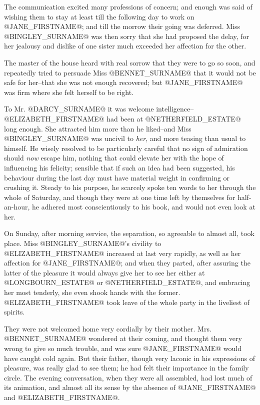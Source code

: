 The communication excited many professions of concern; and enough was
said of wishing them to stay at least till the following day to work
on @JANE_FIRSTNAME@; and till the morrow their going was deferred. Miss @BINGLEY_SURNAME@ was
then sorry that she had proposed the delay, for her jealousy and dislike
of one sister much exceeded her affection for the other.

The master of the house heard with real sorrow that they were to go so
soon, and repeatedly tried to persuade Miss @BENNET_SURNAME@ that it would not be
safe for her--that she was not enough recovered; but @JANE_FIRSTNAME@ was firm where
she felt herself to be right.

To Mr. @DARCY_SURNAME@ it was welcome intelligence--@ELIZABETH_FIRSTNAME@ had been at
@NETHERFIELD_ESTATE@ long enough. She attracted him more than he liked--and Miss
@BINGLEY_SURNAME@ was uncivil to \textit{her}, and more teasing than usual to himself.
He wisely resolved to be particularly careful that no sign of admiration
should \textit{now} escape him, nothing that could elevate her with the hope
of influencing his felicity; sensible that if such an idea had been
suggested, his behaviour during the last day must have material weight
in confirming or crushing it. Steady to his purpose, he scarcely spoke
ten words to her through the whole of Saturday, and though they were
at one time left by themselves for half-an-hour, he adhered most
conscientiously to his book, and would not even look at her.

On Sunday, after morning service, the separation, so agreeable to almost
all, took place. Miss @BINGLEY_SURNAME@'s civility to @ELIZABETH_FIRSTNAME@ increased at last
very rapidly, as well as her affection for @JANE_FIRSTNAME@; and when they parted,
after assuring the latter of the pleasure it would always give her
to see her either at @LONGBOURN_ESTATE@ or @NETHERFIELD_ESTATE@, and embracing her most
tenderly, she even shook hands with the former. @ELIZABETH_FIRSTNAME@ took leave of
the whole party in the liveliest of spirits.

They were not welcomed home very cordially by their mother. Mrs. @BENNET_SURNAME@
wondered at their coming, and thought them very wrong to give so much
trouble, and was sure @JANE_FIRSTNAME@ would have caught cold again. But their
father, though very laconic in his expressions of pleasure, was really
glad to see them; he had felt their importance in the family circle. The
evening conversation, when they were all assembled, had lost much of
its animation, and almost all its sense by the absence of @JANE_FIRSTNAME@ and
@ELIZABETH_FIRSTNAME@.

